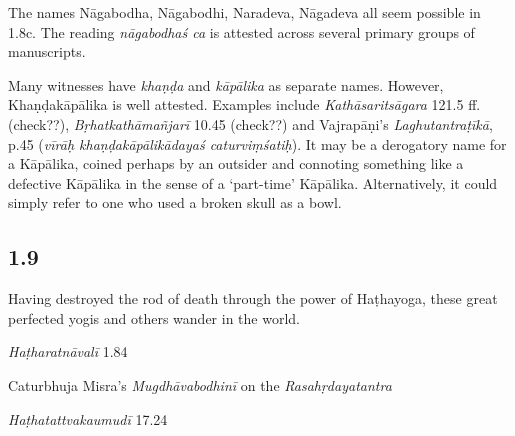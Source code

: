 \begin{ekdosis}
\begin{philcomm}[hp01_008]
The names Nāgabodha, Nāgabodhi, Naradeva, Nāgadeva all seem possible in 1.8c. The reading \emph{nāgabodhaś ca} is attested across several primary groups of manuscripts.

Many witnesses have \emph{khaṇḍa} and \emph{kāpālika} as separate names. However, Khaṇḍa\-kāpālika is well attested. Examples include \emph{Kathāsaritsāgara} 121.5 ff. (check??), \emph{Bṛhatkathāmañjarī} 10.45 (check??) and Vajrapāṇi’s \emph{Laghutantraṭīkā}, p.45 (\emph{vīrāḥ khaṇḍakāpālikādayaś caturviṃśatiḥ}). It may be a derogatory name for a Kāpālika, coined perhaps by an outsider and connoting something like a defective Kāpālika in the sense of a ‘part-time’ Kāpālika. Alternatively, it could simply refer to one who used a broken skull as a bowl.
\end{philcomm}

\subsection*{1.9}
\begin{translation}[hp01_009]
Having destroyed the rod of death through the power of Haṭhayoga, these great perfected yogis and others wander in the world.
\end{translation}

\begin{testimonia}[hp01_009]
\emph{Haṭharatnāvalī} 1.84

\begin{versinnote}
\end{versinnote}

Caturbhuja Misra's \emph{Mugdhāvabodhinī} on the \emph{Rasahṛdayatantra}

\begin{versinnote}
\end{versinnote}

\emph{Haṭhatattvakaumudī} 17.24

\begin{versinnote}
\end{versinnote}


\end{testimonia}
\end{ekdosis}
